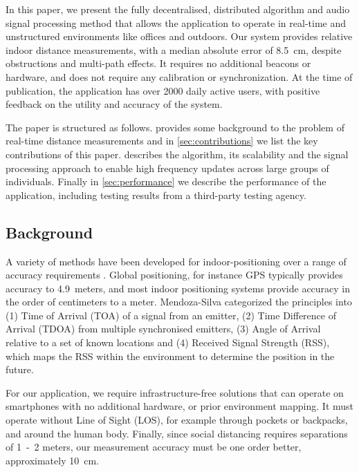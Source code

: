 \documentclass{article}
\begin{document}
In this paper, we present the fully decentralised, distributed algorithm and audio signal processing method that allows the application to operate in real-time and unstructured environments like offices and outdoors. Our system provides relative indoor distance measurements, with a median absolute error of 8.5~cm, despite obstructions and  multi-path effects. It requires no additional beacons or hardware, and does not require any calibration or  synchronization.  At the time of publication, the application has over 2000 daily active users, with positive feedback on the utility and accuracy of the system.

The paper is structured as follows.  provides some background to the problem of real-time distance measurements and in \cref{sec:contributions} we list the key contributions of this paper.  describes the algorithm, its scalability and the signal processing approach to enable high frequency updates across large groups of individuals. Finally in \cref{sec:performance} we describe the performance of the application, including testing results from a third-party testing agency.

\subsection{Background}
\label{sec:background}

A variety of methods have been developed for indoor-positioning over a range of accuracy requirements \cite{MendozaSilva2019}. Global positioning, for instance GPS typically provides accuracy to 4.9~meters, and most indoor positioning systems provide accuracy in the order of centimeters to a meter. Mendoza-Silva categorized the principles into (1) Time of Arrival (TOA) of a signal from an emitter, (2) Time Difference of Arrival (TDOA) from multiple synchronised emitters, (3) Angle of Arrival relative to a set of known locations and (4) Received Signal Strength (RSS), which maps the RSS within the environment to determine the position in the future. 

For our application, we require infrastructure-free solutions that can operate on smartphones with no additional hardware, or prior environment mapping. It must operate without Line of Sight (LOS), for example through pockets or backpacks, and around the human body. Finally, since social distancing requires separations of 1~-~2 meters, our measurement accuracy must be one order better, approximately 10~cm. 
\end{document}
